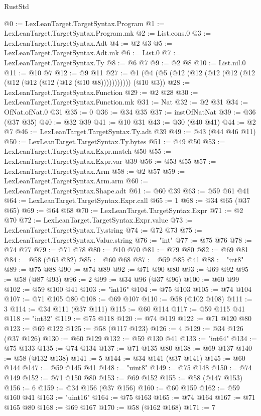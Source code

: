 \begin{lexlean}{RustStd}
\begin{coremodule}
@0 := LexLeanTarget.TargetSyntax.Program
@1 := LexLeanTarget.TargetSyntax.Program.mk
@2 := List.cons.{0}
@3 := LexLeanTarget.TargetSyntax.Adt
@4 := @2 @3
@5 := LexLeanTarget.TargetSyntax.Adt.mk
@6 := List.{0}
@7 := LexLeanTarget.TargetSyntax.Ty
@8 := @6 @7
@9 := @2 @8
@10 := List.nil.{0}
@11 := @10 @7
@12 := @9 @11
@27 := @1 (@4 (@5 (@12 (@12 (@12 (@12 (@12 (@12 (@12 (@12 (@12 (@10 @8))))))))))) (@10 @3))
@28 := LexLeanTarget.TargetSyntax.Function
@29 := @2 @28
@30 := LexLeanTarget.TargetSyntax.Function.mk
@31 := Nat
@32 := @2 @31
@34 := OfNat.ofNat.{0} @31
@35 := 0
@36 := @34 @35
@37 := instOfNatNat
@39 := @36 (@37 @35)
@40 := @32 @39
@41 := @10 @31
@43 := @30 (@40 @41)
@44 := @2 @7
@46 := LexLeanTarget.TargetSyntax.Ty.adt @39
@49 := @43 (@44 @46 @11)
@50 := LexLeanTarget.TargetSyntax.Ty.bytes
@51 := @49 @50
@53 := LexLeanTarget.TargetSyntax.Expr.match @50
@55 := LexLeanTarget.TargetSyntax.Expr.var @39
@56 := @53 @55
@57 := LexLeanTarget.TargetSyntax.Arm
@58 := @2 @57
@59 := LexLeanTarget.TargetSyntax.Arm.arm
@60 := LexLeanTarget.TargetSyntax.Shape.adt
@61 := @60 @39
@63 := @59 @61 @41
@64 := LexLeanTarget.TargetSyntax.Expr.call
@65 := 1
@68 := @34 @65 (@37 @65)
@69 := @64 @68
@70 := LexLeanTarget.TargetSyntax.Expr
@71 := @2 @70
@72 := LexLeanTarget.TargetSyntax.Expr.value
@73 := LexLeanTarget.TargetSyntax.Ty.string
@74 := @72 @73
@75 := LexLeanTarget.TargetSyntax.Value.string
@76 := "int"
@77 := @75 @76
@78 := @74 @77
@79 := @71 @78
@80 := @10 @70
@81 := @79 @80
@82 := @69 @81
@84 := @58 (@63 @82)
@85 := @60 @68
@87 := @59 @85 @41
@88 := "int8"
@89 := @75 @88
@90 := @74 @89
@92 := @71 @90 @80
@93 := @69 @92
@95 := @58 (@87 @93)
@96 := 2
@99 := @34 @96 (@37 @96)
@100 := @60 @99
@102 := @59 @100 @41
@103 := "int16"
@104 := @75 @103
@105 := @74 @104
@107 := @71 @105 @80
@108 := @69 @107
@110 := @58 (@102 @108)
@111 := 3
@114 := @34 @111 (@37 @111)
@115 := @60 @114
@117 := @59 @115 @41
@118 := "int32"
@119 := @75 @118
@120 := @74 @119
@122 := @71 @120 @80
@123 := @69 @122
@125 := @58 (@117 @123)
@126 := 4
@129 := @34 @126 (@37 @126)
@130 := @60 @129
@132 := @59 @130 @41
@133 := "int64"
@134 := @75 @133
@135 := @74 @134
@137 := @71 @135 @80
@138 := @69 @137
@140 := @58 (@132 @138)
@141 := 5
@144 := @34 @141 (@37 @141)
@145 := @60 @144
@147 := @59 @145 @41
@148 := "uint8"
@149 := @75 @148
@150 := @74 @149
@152 := @71 @150 @80
@153 := @69 @152
@155 := @58 (@147 @153)
@156 := 6
@159 := @34 @156 (@37 @156)
@160 := @60 @159
@162 := @59 @160 @41
@163 := "uint16"
@164 := @75 @163
@165 := @74 @164
@167 := @71 @165 @80
@168 := @69 @167
@170 := @58 (@162 @168)
@171 := 7

\end{coremodule}
\end{lexlean}
